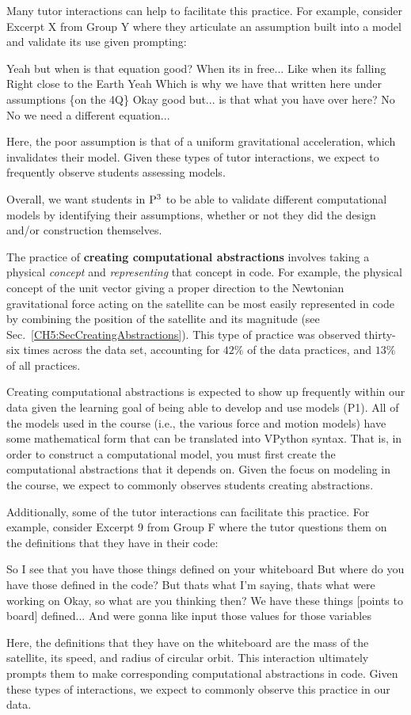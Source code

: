 \documentclass{msuphddissertation}
\begin{document}
\begin{doublespace}
Many tutor interactions can help to facilitate this practice.  For example, consider Excerpt X from Group Y where they articulate an assumption built into a model and validate its use given prompting: \begin{description}
\TA Yeah but when is that equation good?
\SB When its in free...
\SC Like when its falling
\TA Right close to the Earth
\SB Yeah
\SC Which is why we have that written here under assumptions \{on the 4Q\}
\TA Okay good but... is that what you have over here?
\SB No
\SC No we need a different equation...
\end{description}  Here, the poor assumption is that of a uniform gravitational acceleration, which invalidates their model.  Given these types of tutor interactions, we expect to frequently observe students assessing models.

Overall, we want students in ${\rm P}^{3}$ to be able to validate different computational models by identifying their assumptions, whether or not they did the design and/or construction themselves.

The practice of \textbf{creating computational abstractions} involves taking a physical \textit{concept} and \textit{representing} that concept in code.  For example, the physical concept of the unit vector giving a proper direction to the Newtonian gravitational force acting on the satellite can be most easily represented in code by combining the position of the satellite and its magnitude (see Sec.~\ref{CH5:SecCreatingAbstractions}).  This type of practice was observed thirty-six times across the data set, accounting for $42\%$ of the data practices, and $13\%$ of all practices.

Creating computational abstractions is expected to show up frequently within our data given the learning goal of being able to develop and use models (P1).  All of the models used in the course (i.e., the various force and motion models) have some mathematical form that can be translated into VPython syntax.  That is, in order to construct a computational model, you must first create the computational abstractions that it depends on.  Given the focus on modeling in the course, we expect to commonly observes students creating abstractions.

Additionally, some of the tutor interactions can facilitate this practice.  For example, consider Excerpt 9 from Group F where the tutor questions them on the definitions that they have in their code: \begin{description}
\TA So I see that you have those things defined on your whiteboard
\TA But where do you have those defined in the code?
\SA But thats what I'm saying, thats what were working on
\TA Okay, so what are you thinking then?
\SA We have these things [points to board] defined...
\SA And were gonna like input those values for those {variables}
\end{description}  Here, the definitions that they have on the whiteboard are the mass of the satellite, its speed, and radius of circular orbit.  This interaction ultimately prompts them to make corresponding computational abstractions in code.  Given these types of interactions, we expect to commonly observe this practice in our data.


\end{doublespace}
\end{document}
